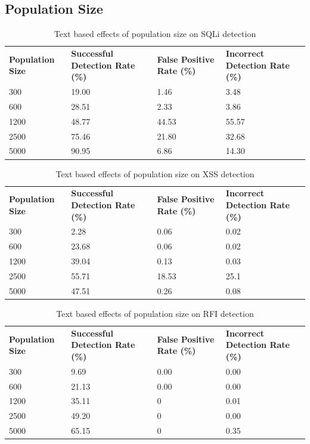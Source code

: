\begin{appendices}
\subsection{Population Size}
\begin{table}[h]
	\centering
	\begin{tabular}{|p{1.5in}|p{1in}|p{1in}|p{1in}|}
	\hline
	\textbf{Population Size} & \textbf{Successful Detection Rate (\%)} & \textbf{False Positive Rate (\%)} & \textbf{Incorrect Detection Rate (\%)}  \\
	\hhline{|=|=|=|=|}
	300 & 19.00 & 1.46 & 3.48 \\
	\hline
	600 & 28.51 & 2.33 & 3.86 \\
	\hline
	1200 & 48.77 & 44.53 & 55.57 \\
	\hline
	2500 & 75.46 & 21.80 & 32.68 \\
	\hline
	5000 & 90.95 & 6.86 & 14.30 \\
	\hline
	\end{tabular}
	\caption{Text based effects of population size on SQLi detection}
\end{table}
\begin{table}[h]
	\centering
	\begin{tabular}{|p{1.5in}|p{1in}|p{1in}|p{1in}|}
	\hline
	\textbf{Population Size} & \textbf{Successful Detection Rate (\%)} & \textbf{False Positive Rate (\%)} & \textbf{Incorrect Detection Rate (\%)}  \\
	\hhline{|=|=|=|=|}
	300 & 2.28 & 0.06 & 0.02 \\
	\hline
	600 & 23.68 & 0.06 & 0.02 \\
	\hline
	1200 & 39.04 & 0.13 & 0.03 \\
	\hline
	2500 & 55.71 & 18.53 & 25.1 \\
	\hline
	5000 & 47.51 & 0.26 & 0.08 \\
	\hline
	\end{tabular}
	\caption{Text based effects of population size on XSS detection}
\end{table}
\begin{table}[h]
	\centering
	\begin{tabular}{|p{1.5in}|p{1in}|p{1in}|p{1in}|}
	\hline
	\textbf{Population Size} & \textbf{Successful Detection Rate (\%)} & \textbf{False Positive Rate (\%)} & \textbf{Incorrect Detection Rate (\%)}  \\
	\hhline{|=|=|=|=|}
	300 & 9.69 & 0.00 & 0.00 \\
	\hline
	600 & 21.13 & 0.00 & 0.00 \\
	\hline
	1200 & 35.11 & 0 & 0.01 \\
	\hline
	2500 & 49.20 & 0 & 0.00 \\
	\hline
	5000 & 65.15 & 0 & 0.35 \\
	\hline
	\end{tabular}
	\caption{Text based effects of population size on RFI detection}
\end{table}


\end{appendices}
